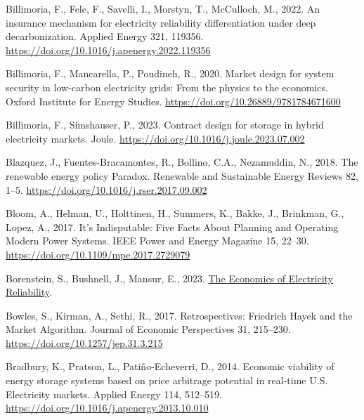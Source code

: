\documentclass[12pt,a4paper,]{report}
\newlength{\cslhangindent}
\newenvironment{CSLReferences}[2] %
 {%
  \setlength{\parindent}{0pt}
  \ifodd #1 \everypar{\setlength{\hangindent}{\cslhangindent}}\ignorespaces\fi
  \ifnum #2 > 0
  \setlength{\parskip}{#2\baselineskip}
  \fi
 }%
 {}
\begin{document}
\begin{CSLReferences}{1}{0}
\leavevmode{}%
Billimoria, F., Fele, F., Savelli, I., Morstyn, T., McCulloch, M., 2022.
An insurance mechanism for electricity reliability differentiation under
deep decarbonization. Applied Energy 321, 119356.
\url{https://doi.org/10.1016/j.apenergy.2022.119356}

\leavevmode{}%
Billimoria, F., Mancarella, P., Poudineh, R., 2020. Market design for
system security in low-carbon electricity grids: From the physics to the
economics. Oxford Institute for Energy Studies.
\url{https://doi.org/10.26889/9781784671600}

\leavevmode{}%
Billimoria, F., Simshauser, P., 2023. Contract design for storage in
hybrid electricity markets. Joule.
\url{https://doi.org/10.1016/j.joule.2023.07.002}

\leavevmode{}%
Blazquez, J., Fuentes-Bracamontes, R., Bollino, C.A., Nezamuddin, N.,
2018. The renewable energy policy {Paradox}. Renewable and Sustainable
Energy Reviews 82, 1--5.
\url{https://doi.org/10.1016/j.rser.2017.09.002}

\leavevmode{}%
Bloom, A., Helman, U., Holttinen, H., Summers, K., Bakke, J., Brinkman,
G., Lopez, A., 2017. It's {Indisputable}: {Five Facts About Planning}
and {Operating Modern Power Systems}. IEEE Power and Energy Magazine 15,
22--30. \url{https://doi.org/10.1109/mpe.2017.2729079}

\leavevmode{}%
Borenstein, S., Bushnell, J., Mansur, E., 2023.
\href{https://haas.berkeley.edu/wp-content/uploads/WP336.pdf}{The
{Economics} of {Electricity Reliability}}.

\leavevmode{}%
Bowles, S., Kirman, A., Sethi, R., 2017. Retrospectives: {Friedrich
Hayek} and the {Market Algorithm}. Journal of Economic Perspectives 31,
215--230. \url{https://doi.org/10.1257/jep.31.3.215}

\leavevmode{}%
Bradbury, K., Pratson, L., Patiño-Echeverri, D., 2014. Economic
viability of energy storage systems based on price arbitrage potential
in real-time {U}.{S}. Electricity markets. Applied Energy 114, 512--519.
\url{https://doi.org/10.1016/j.apenergy.2013.10.010}


\end{CSLReferences}
\end{document}
